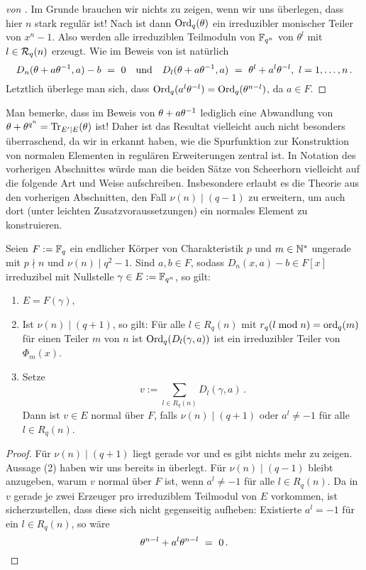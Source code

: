 \begin{proof}[von ]
  Im Grunde brauchen wir nichts zu zeigen, wenn wir uns überlegen, dass
  hier $n$ stark regulär ist! Nach 
  ist dann $\operatorname{Ord}_q(\theta)$ ein irreduzibler monischer Teiler von $x^n-1$. Also
  werden alle irreduziblen Teilmoduln von $\mathbb{F}_{q^n}$ von $\theta^l$ mit 
  $l\in \mathcal{R}_q(n)$ erzeugt.  Wie im Beweis von  ist
  natürlich 
  \[ D_n(\theta+a\theta\inv,a)-b \speq= 0 \quad\text{und}\quad
    D_l(\theta+a\theta\inv,a) \speq= \theta^l+a^l\theta^{-l},\ l=1,\ldots,n\,. \]
  Letztlich überlege man sich, dass $\operatorname{Ord}_q(a^l\theta^{-l}) =
  \operatorname{Ord}_q(\theta^{n-l})$, da $a \in F$. 
\end{proof}


Man bemerke, dass im Beweis von 
$\theta + a\theta^{-1}$ lediglich eine
Abwandlung von $\theta + \theta^{q^n} = \operatorname{Tr}_{E'\mid E}(\theta)$ ist!
Daher ist das Resultat vielleicht auch nicht besonders überraschend,
da wir in  erkannt haben, wie die Spurfunktion
zur Konstruktion von normalen Elementen in regulären Erweiterungen zentral ist.
In Notation des vorherigen Abschnittes würde man die beiden Sätze von
Scheerhorn vielleicht auf die folgende Art und Weise aufschreiben. 
Insbesondere erlaubt es die Theorie aus den vorherigen Abschnitten, den Fall
$\nu(n)\mid (q-1)$ zu erweitern, um auch dort (unter leichten
Zusatzvoraussetzungen) ein normales Element zu konstruieren.

\begin{satz}
  \label{satz:scheerhorn_erweitert}
  Seien $F := \mathbb{F}_q$ ein endlicher Körper von Charakteristik $p$ und $m\in
  \mathbb{N}^\ast$ ungerade mit $p\nmid n$ und $\nu(n)\mid q^2-1$. Sind $a,b\in F$, 
  sodass $D_n(x,a)-b \in F[x]$ irreduzibel mit Nullstelle $\gamma \in E:=
  \mathbb{F}_{q^n}$, so gilt:
  \begin{enumerate}
    \item $E = F(\gamma)$,
    \item Ist $\nu(n)\mid (q+1)$, so gilt:
      Für alle $l\in R_q(n)$ mit $r_q(l\bmod n) = \operatorname{ord}_q(m)$ 
      für einen Teiler $m$ von $n$ ist 
      $\operatorname{Ord}_q(D_l(\gamma,a))$ ist ein irreduzibler Teiler von
      $\Phi_m(x)$.
    \item Setze 
      \[ v := \sum_{l\in R_q(n)} D_l(\gamma,a)\,. \]
      Dann ist $v \in E$ normal über $F$, falls
      $\nu(n)\mid (q+1)$ oder $a^l\neq -1$ für alle $l \in R_q(n)$.
  \end{enumerate}
\end{satz}
\begin{proof}
  Für $\nu(n)\mid (q+1)$ liegt gerade  vor und es gibt
  nichts mehr zu zeigen. Aussage (2) haben wir uns bereits in
   überlegt.
  Für $\nu(n)\mid (q-1)$ bleibt anzugeben, warum $v$ normal über $F$ ist, wenn
  $a^l\neq -1$ für alle $l\in R_q(n)$. 
  Da in $v$ gerade je zwei Erzeuger pro irreduziblem Teilmodul von $E$
  vorkommen, ist sicherzustellen, dass diese sich nicht gegenseitig aufheben:
  Existierte $a^l = -1$ für ein $l\in R_q(n)$, so wäre
  \[ \theta^{n-l} + a^l\theta^{n-l} \ =\  0\,.\]
\end{proof}


